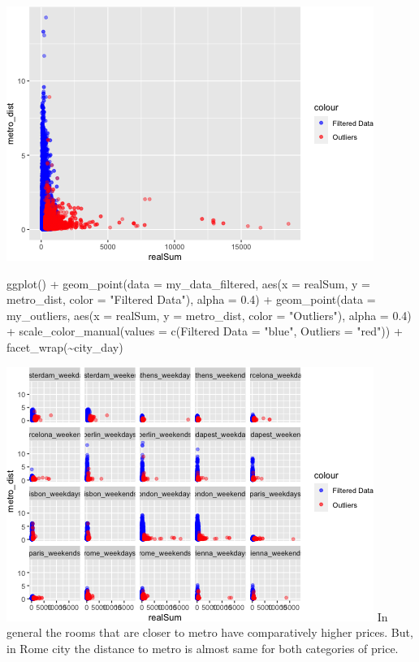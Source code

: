 \documentclass[
]{article}
\newenvironment{Shaded}{\begin{snugshade}}{\end{snugshade}}
\newcommand{\AttributeTok}[1]{\textcolor[rgb]{0.77,0.63,0.00}{#1}}
\newcommand{\FloatTok}[1]{\textcolor[rgb]{0.00,0.00,0.81}{#1}}
\newcommand{\FunctionTok}[1]{\textcolor[rgb]{0.00,0.00,0.00}{#1}}
\newcommand{\NormalTok}[1]{#1}
\newcommand{\OtherTok}[1]{\textcolor[rgb]{0.56,0.35,0.01}{#1}}
\newcommand{\SpecialCharTok}[1]{\textcolor[rgb]{0.00,0.00,0.00}{#1}}
\newcommand{\StringTok}[1]{\textcolor[rgb]{0.31,0.60,0.02}{#1}}
\begin{document}
\includegraphics{Project_files/figure-latex/unnamed-chunk-14-1.png}

\begin{Shaded}
\begin{Highlighting}[]
\FunctionTok{ggplot}\NormalTok{() }\SpecialCharTok{+} \FunctionTok{geom\_point}\NormalTok{(}\AttributeTok{data =}\NormalTok{ my\_data\_filtered, }\FunctionTok{aes}\NormalTok{(}\AttributeTok{x =}\NormalTok{ realSum,}
    \AttributeTok{y =}\NormalTok{ metro\_dist, }\AttributeTok{color =} \StringTok{"Filtered Data"}\NormalTok{), }\AttributeTok{alpha =} \FloatTok{0.4}\NormalTok{) }\SpecialCharTok{+}
    \FunctionTok{geom\_point}\NormalTok{(}\AttributeTok{data =}\NormalTok{ my\_outliers, }\FunctionTok{aes}\NormalTok{(}\AttributeTok{x =}\NormalTok{ realSum, }\AttributeTok{y =}\NormalTok{ metro\_dist,}
        \AttributeTok{color =} \StringTok{"Outliers"}\NormalTok{), }\AttributeTok{alpha =} \FloatTok{0.4}\NormalTok{) }\SpecialCharTok{+} \FunctionTok{scale\_color\_manual}\NormalTok{(}\AttributeTok{values =} \FunctionTok{c}\NormalTok{(}\StringTok{\textasciigrave{}}\AttributeTok{Filtered Data}\StringTok{\textasciigrave{}} \OtherTok{=} \StringTok{"blue"}\NormalTok{,}
    \AttributeTok{Outliers =} \StringTok{"red"}\NormalTok{)) }\SpecialCharTok{+} \FunctionTok{facet\_wrap}\NormalTok{(}\SpecialCharTok{\textasciitilde{}}\NormalTok{city\_day)}
\end{Highlighting}
\end{Shaded}

\includegraphics{Project_files/figure-latex/unnamed-chunk-14-2.png} In
general the rooms that are closer to metro have comparatively higher
prices. But, in Rome city the distance to metro is almost same for both
categories of price.
\end{document}
